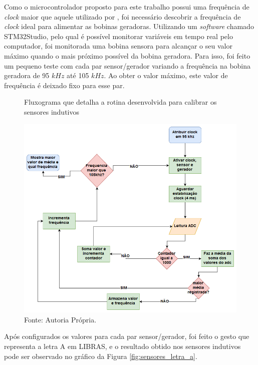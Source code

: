 Como o microcontrolador proposto para este trabalho possui uma frequência de \textit{clock} maior que aquele utilizado por , foi necessário descobrir a frequência de \textit{clock} ideal para alimentar as bobinas geradoras. Utilizando um \textit{software} chamado STM32Studio, pelo qual é possível monitorar variáveis em tempo real pelo computador, foi monitorada uma bobina sensora para alcançar o seu valor máximo quando o mais próximo possível da bobina geradora. Para isso, foi feito um pequeno teste com cada par sensor/gerador variando a frequência na bobina geradora de 95 $kHz$ até 105 $kHz$. Ao obter o valor máximo, este valor de frequência é deixado fixo para esse par.

\begin{figure}[H]
	\vspace{4mm}
	\centering
	\caption{Fluxograma que detalha a rotina desenvolvida para calibrar os sensores indutivos}
	\label{fig:fluxograma_calibragem_ind}
	\includegraphics[scale=0.5]{imagens/calibrarIndutivo}	
	\caption*{Fonte: Autoria Própria.}
\end{figure}

Após configurados os valores para cada par sensor/gerador, foi feito o gesto que representa a letra A em LIBRAS, e o resultado obtido nos sensores indutivos pode ser observado no gráfico da Figura \ref{fig:sensores_letra_a}.

